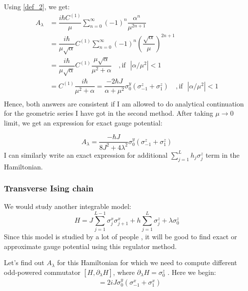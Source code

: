 \documentclass[11pt,a4paper]{article}
\begin{document}
Using \ref{def_2}, we get: %
\begin{align*}
A_{\lambda} &=  \dfrac{i\hbar  C^{(1)}}{\mu}\sum_{n=0}^{\infty}   (-1)^{n} \dfrac{ \alpha^{n}}{\mu^{2n+1}} \\
&=  \dfrac{i\hbar}{\mu \sqrt{\alpha}}  C^{(1)}\sum_{n=0}^{\infty}   (-1)^{n} \left(\dfrac{ \sqrt{\alpha}}{\mu} \right)^{2n+1} \\
&=  \dfrac{i\hbar}{\mu \sqrt{\alpha}}  C^{(1)} \dfrac{\mu \sqrt{\alpha}}{ \mu^2 + \alpha}\quad, \mbox{if ~} |\alpha / \mu^2| <1 \\
&=    C^{(1)}  \dfrac{ i\hbar  }{ \mu^2 + \alpha}= \dfrac{-2 \hbar J}{{\alpha + \mu^2}} \sigma_0^y ( \sigma_{-1}^z + \sigma_1^z) \quad, \mbox{if ~} |\alpha / \mu^2| <1 \\
\end{align*}
Hence, both answers are consistent if I am allowed to do analytical continuation for the geometric series I have got in the second method. After taking $\mu \rightarrow 0$ limit, we get an expression for exact gauge potential:

\begin{equation}
\boxed{ A_{\lambda} = \dfrac{- \hbar J}{{8 J^2 + 4 \lambda ^2 }} \sigma_0^y ( \sigma_{-1}^z + \sigma_1^z)}
\end{equation}
I can similarly write an exact expression for additional $\sum_{j=1}^L h_j \sigma_j^z$ term in the Hamiltonian.
\subsubsection*{Transverse Ising chain}
We would study another integrable model:
\begin{equation}
H= J \sum_{j=1}^{L-1}  \sigma_j^x \sigma_{j+1}^x + h \sum_{j=1}^L \sigma_j^z + \lambda  \sigma_0^z
\label{xx_z}
\end{equation}
Since this model is studied by a lot of people \cite{del2012assisted, kolodrubetz2016geometry}, it will be good to find exact or approximate gauge potential using this regulator method.


Let's find out $A_{\lambda}$ for this Hamiltonian for which we need to compute different odd-powered commutator $[H, \partial_{\lambda} H]$, where $\partial_{\lambda} H=\sigma_0^z$ . Here we begin:
\begin{align*}
[H, \partial_{\lambda} H] &= 2 i J \sigma_0^y ( \sigma_{-1}^x + \sigma_1^x) \\ 
\end{align*}
\end{document}
